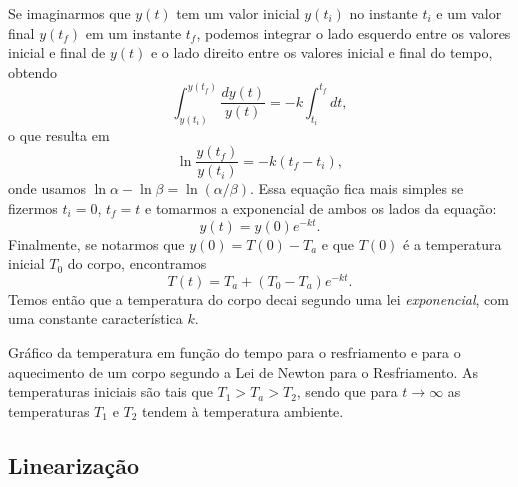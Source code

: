 Se imaginarmos que $y(t)$ tem um valor inicial $y(t_i)$ no instante $t_i$ e um valor final $y(t_f)$ em um instante $t_f$, podemos integrar o lado esquerdo entre os valores inicial e final de $y(t)$ e o lado direito entre os valores inicial e final do tempo, obtendo
\begin{equation}
	\int_{y(t_i)}^{y(t_f)} \frac{dy(t)}{y(t)} = -k \int_{t_i}^{t_f} dt,
\end{equation}
%
o que resulta em
\begin{equation}\label{Eq:TempFuncTempoLN}
	\ln \frac{y(t_f)}{y(t_i)} = - k (t_f - t_i),
\end{equation}
%
onde usamos $\ln \alpha - \ln \beta = \ln (\alpha/\beta)$. Essa equação fica mais simples se fizermos $t_i = 0$, $t_f = t$ e tomarmos a exponencial de ambos os lados da equação:
\begin{equation}
	y(t) = y(0) e^{-kt}.
\end{equation}
%
Finalmente, se notarmos que $y(0) = T(0) - T_a$ e que $T(0)$ é a temperatura inicial $T_0$ do corpo, encontramos
\begin{equation}
	T(t) = T_a + (T_0 - T_a)e^{-kt}.
\end{equation}
%
Temos então que a temperatura do corpo decai segundo uma lei \emph{exponencial}, com uma constante característica $k$.
%
\begin{marginfigure}
\centering
{}
\caption{Gráfico da temperatura em função do tempo para o resfriamento e para o aquecimento de um corpo segundo a Lei de Newton para o Resfriamento. As temperaturas iniciais são tais que $T_1 > T_a > T_2$, sendo que para $t\to\infty$ as temperaturas $T_1$ e $T_2$ tendem à temperatura ambiente.}
\end{marginfigure}

\subsection{Linearização}

